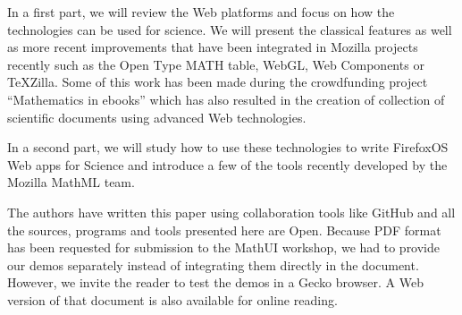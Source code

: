 In a first part, we will review the Web platforms and focus on how the
technologies can be used for science. We will present the classical features
as well as more recent improvements that have been integrated in Mozilla
projects recently such as the Open Type MATH table, WebGL, Web Components or
TeXZilla. Some of this work has been made during the crowdfunding project
``Mathematics in ebooks'' which has also resulted in the creation of collection
of scientific documents using advanced Web technologies.

In a second
part, we will study how to use these technologies to write FirefoxOS Web apps
for Science and introduce a few of the tools recently developed by the Mozilla
MathML team.

The authors have written this paper using collaboration tools like GitHub and
all the sources, programs and tools presented here are Open. Because PDF format
has been requested for submission to the MathUI workshop, we had to provide
our demos separately instead of integrating them directly in the document.
However, we invite the reader to test the demos in a Gecko browser. A Web
version of that document is also available for online reading.
